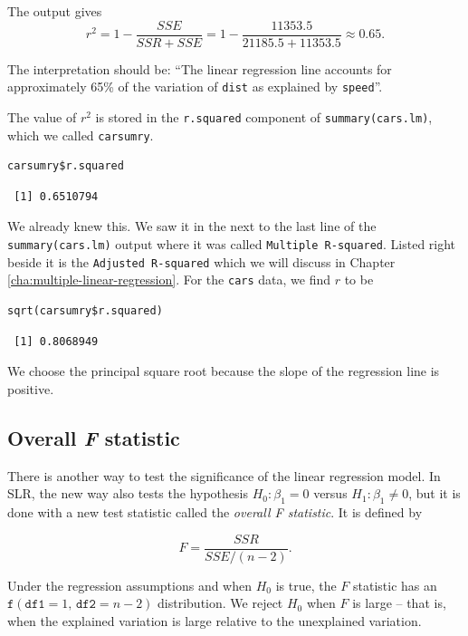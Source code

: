 \documentclass[captions=tableheading]{scrbook}
\begin{document}
The output gives
\[
r^{2}=1-\frac{SSE}{SSR+SSE}=1-\frac{11353.5}{21185.5+11353.5}\approx0.65.
\]

The interpretation should be: ``The linear regression line accounts for approximately 65\% of the variation of \texttt{dist} as explained by \texttt{speed}''.

The value of \(r^{2}\) is stored in the \texttt{r.squared} component of \texttt{summary(cars.lm)}, which we called \texttt{carsumry}.


\begin{verbatim}
carsumry$r.squared
\end{verbatim}

\begin{verbatim}
 [1] 0.6510794
\end{verbatim}

We already knew this. We saw it in the next to the last line of the \texttt{summary(cars.lm)} output where it was called \texttt{Multiple R-squared}. Listed right beside it is the \texttt{Adjusted R-squared} which we will discuss in Chapter \ref{cha:multiple-linear-regression}.  For the \texttt{cars} data, we find \(r\) to be


\begin{verbatim}
sqrt(carsumry$r.squared)
\end{verbatim}

\begin{verbatim}
 [1] 0.8068949
\end{verbatim}

We choose the principal square root because the slope of the regression line is positive.
\subsection{Overall \emph{F} statistic}
\label{sec-11-3-3}

\label{sub:slr-overall-F-statistic}

There is another way to test the significance of the linear regression model. In SLR, the new way also tests the hypothesis \(H_{0}:\beta_{1}=0\) versus \(H_{1}:\beta_{1}\neq0\), but it is done with a new test statistic called the \emph{overall F statistic}. It is defined by

\begin{equation}
F=\frac{SSR}{SSE/(n-2)}.\label{eq:slr-overall-F-statistic}
\end{equation}

Under the regression assumptions and when \(H_{0}\) is true, the \(F\) statistic has an \(\mathtt{f}(\mathtt{df1}=1,\,\mathtt{df2}=n-2)\) distribution. We reject \(H_{0}\) when \(F\) is large -- that is, when the explained variation is large relative to the unexplained variation.
\end{document}
